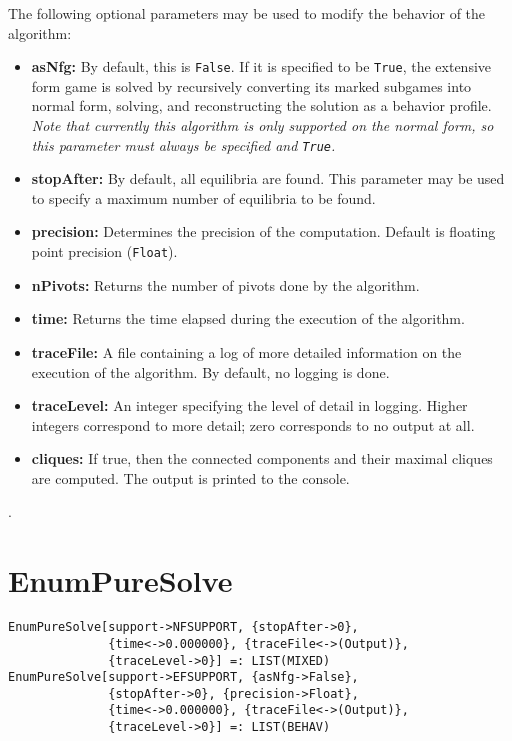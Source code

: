 The following optional parameters may be used to modify the behavior
of the algorithm:
\begin{itemize}
\item
\textbf{asNfg:} By default, this is \verb+False+.  If it is specified to be
\verb+True+, the extensive form game is solved by recursively converting
its marked subgames into normal form, solving, and reconstructing the
solution as a behavior profile.  {\it Note that currently this algorithm
is only supported on the normal form, so this parameter
must always be specified and {\tt True}.} 
\item
\textbf{stopAfter:} By default, all equilibria are found.  This parameter may
be used to specify a maximum number of equilibria to be found.
\item
\textbf{precision:} Determines the precision of the computation. Default is
floating point precision (\verb+Float+). 
\item
\textbf{nPivots:} Returns the number of pivots done by the
algorithm.
\item
\textbf{time:} Returns the time elapsed during the execution
of the algorithm.
\item
\textbf{traceFile:} A file containing a log of more detailed information on the
execution of the algorithm.  By default, no logging is done.
\item
\textbf{traceLevel:} An integer specifying the level of detail in logging.
Higher integers correspond to more detail; zero corresponds to no output
at all.
\item
\textbf{cliques:} If true, then the connected components and their maximal
cliques are computed.  The output is printed to the console.
\end{itemize}

\seealso {}.


\section*{EnumPureSolve}\label{PrimEnumPureSolve}

\begin{verbatim}
EnumPureSolve[support->NFSUPPORT, {stopAfter->0}, 
              {time<->0.000000}, {traceFile<->(Output)},
              {traceLevel->0}] =: LIST(MIXED) 
EnumPureSolve[support->EFSUPPORT, {asNfg->False}, 
              {stopAfter->0}, {precision->Float}, 
              {time<->0.000000}, {traceFile<->(Output)}, 
              {traceLevel->0}] =: LIST(BEHAV) 
\end{verbatim}

